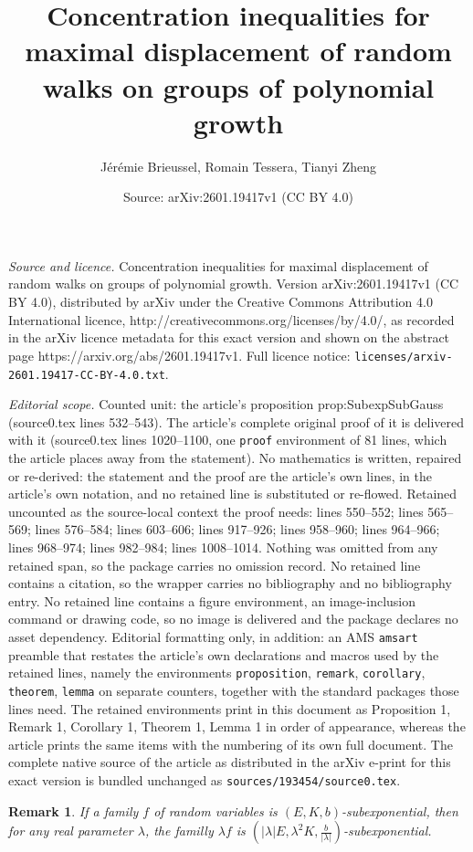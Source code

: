 \documentclass[10pt,a4paper]{amsart}
\title{Concentration inequalities for maximal displacement of random walks on groups of polynomial growth}
\author{J\'er\'emie Brieussel, Romain Tessera, Tianyi Zheng}
\date{Source: arXiv:2601.19417v1 (CC BY 4.0)}
\newtheorem{remark}{Remark}
\begin{document}
\maketitle

\noindent\emph{Source and licence.} Concentration inequalities for maximal displacement of random walks on groups of polynomial growth. Version arXiv:2601.19417v1 (CC BY 4.0), distributed by arXiv under the Creative Commons Attribution 4.0 International licence, http://creativecommons.org/licenses/by/4.0/, as recorded in the arXiv licence metadata for this exact version and shown on the abstract page https://arxiv.org/abs/2601.19417v1. Full licence notice: \texttt{licenses/arxiv-2601.19417-CC-BY-4.0.txt}.\par\smallskip

\noindent\textit{Editorial scope.} Counted unit: the article's proposition prop:SubexpSubGauss (source0.tex lines 532--543). The article's complete original proof of it is delivered with it (source0.tex lines 1020--1100, one \texttt{proof} environment of 81 lines, which the article places away from the statement). No mathematics is written, repaired or re-derived: the statement and the proof are the article's own lines, in the article's own notation, and no retained line is substituted or re-flowed.  Retained uncounted as the source-local context the proof needs: lines 550--552; lines 565--569; lines 576--584; lines 603--606; lines 917--926; lines 958--960; lines 964--966; lines 968--974; lines 982--984; lines 1008--1014.  Nothing was omitted from any retained span, so the package carries no omission record.  No retained line contains a citation, so the wrapper carries no bibliography and no bibliography entry.  No retained line contains a figure environment, an image-inclusion command or drawing code, so no image is delivered and the package declares no asset dependency.  Editorial formatting only, in addition: an AMS \texttt{amsart} preamble that restates the article's own declarations and macros used by the retained lines, namely the environments \texttt{proposition}, \texttt{remark}, \texttt{corollary}, \texttt{theorem}, \texttt{lemma} on separate counters, together with the standard packages those lines need.  The retained environments print in this document as Proposition 1, Remark 1, Corollary 1, Theorem 1, Lemma 1 in order of appearance, whereas the article prints the same items with the numbering of its own full document.  The complete native source of the article as distributed in the arXiv e-print for this exact version is bundled unchanged as \texttt{sources/193454/source0.tex}.
\begin{remark}\label{rk:lambda}
If a family $f$ of random variables is $(E,K,b)$-subexponential, then for any real parameter $\lambda$, the familly $\lambda f$ is $(|\lambda| E, \lambda^2 K, \frac{b}{|\lambda|})$-subexponential.
\end{remark}
\end{document}
